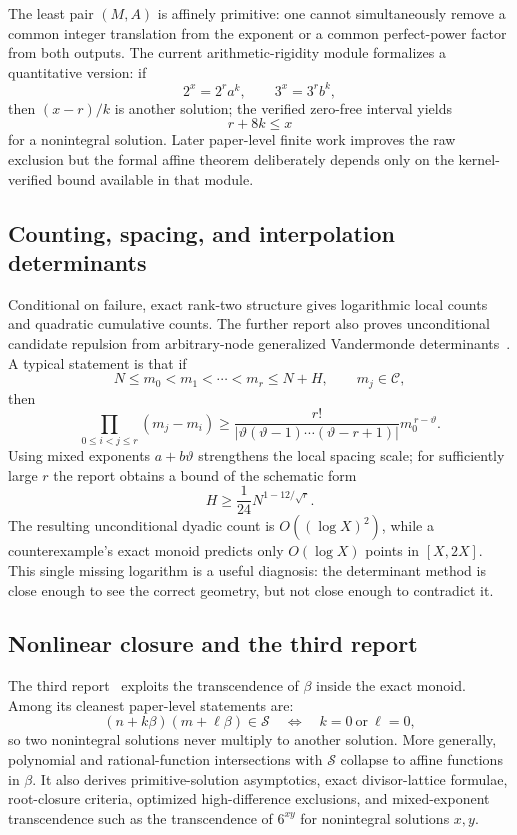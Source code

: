 \documentclass[11pt,oneside]{article}
\theoremstyle{definition}
\theoremstyle{remark}
\newcommand{\Sol}{\mathcal S}
\newcommand{\Cand}{\mathcal C}
\begin{document}
The least pair $(M,A)$ is affinely primitive: one cannot simultaneously remove a common
integer translation from the exponent or a common perfect-power factor from both outputs.
The current arithmetic-rigidity module formalizes a quantitative version: if
\[
  2^x=2^r a^k,\qquad 3^x=3^r b^k,
\]
then $(x-r)/k$ is another solution; the verified zero-free interval yields
\[
  r+8k\le x
\]
for a nonintegral solution.  Later paper-level finite work improves the raw exclusion but the
formal affine theorem deliberately depends only on the kernel-verified bound available in
that module.

\subsection{Counting, spacing, and interpolation determinants}

Conditional on failure, exact rank-two structure gives logarithmic local counts and quadratic
cumulative counts.  The further report also proves unconditional candidate repulsion from
arbitrary-node generalized Vandermonde determinants~\cite{ProveItFurther}.  A typical statement is that if
\[
  N\le m_0<m_1<\cdots<m_r\le N+H,
  \qquad m_j\in\Cand,
\]
then
\[
  \prod_{0\le i<j\le r}(m_j-m_i)
  \ge
  \frac{r!}{\left|\vartheta(\vartheta-1)\cdots(\vartheta-r+1)\right|}
  m_0^{\,r-\vartheta}.
\]
Using mixed exponents $a+b\vartheta$ strengthens the local spacing scale; for sufficiently
large $r$ the report obtains a bound of the schematic form
\[
  H\ge \frac1{24}N^{1-12/\sqrt r}.
\]
The resulting unconditional dyadic count is $O((\log X)^2)$, while a counterexample's exact
monoid predicts only $O(\log X)$ points in $[X,2X]$.  This single missing logarithm is a useful
diagnosis: the determinant method is close enough to see the correct geometry, but not close
enough to contradict it.

\subsection{Nonlinear closure and the third report}

The third report~\cite{ProveItReport3} exploits the transcendence of $\beta$ inside the exact monoid.  Among its
cleanest paper-level statements are:
\[
  (n+k\beta)(m+\ell\beta)\in\Sol
  \quad\Longleftrightarrow\quad
  k=0\ \text{or}\ \ell=0,
\]
so two nonintegral solutions never multiply to another solution.  More generally, polynomial
and rational-function intersections with $\Sol$ collapse to affine functions in $\beta$.
It also derives primitive-solution asymptotics, exact divisor-lattice formulae, root-closure
criteria, optimized high-difference exclusions, and mixed-exponent transcendence such as the
transcendence of $6^{xy}$ for nonintegral solutions $x,y$.
\end{document}

